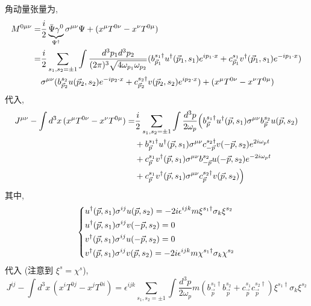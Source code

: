 \begin{itemize}
	\begin{tcolorbox}[title=calculation:]
		角动量张量为,
		\begin{align}
			M^{0 \mu \nu} =& \frac{i}{2} \underbrace{\bar{\Psi} \gamma^0}_{\Psi^\dag} \sigma^{\mu \nu} \Psi + (x^\mu T^{0 \nu} - x^\nu T^{0 \mu}) \notag \\
			=& \frac{i}{2} \sum_{s_1, s_2 = \pm 1} \int \frac{d^3 p_1 d^3 p_2}{(2 \pi)^3 \sqrt{4 \omega_{p_1} \omega_{p_2}}} (b^{s_1 \dag}_{\vec{p}_1} u^\dag(\vec{p}_1, s_1) e^{i p_1 \cdot x} + c^{s_1}_{\vec{p}_1} v^\dag(\vec{p}_1, s_1) e^{- i p_1 \cdot x}) \notag \\
			& \sigma^{\mu \nu} (b^{s_2}_{\vec{p}_2} u(\vec{p}_2, s_2) e^{- i p_2 \cdot x} + c^{s_2 \dag}_{\vec{p}_2} v(\vec{p}_2, s_2) e^{i p_2 \cdot x}) + (x^\mu T^{0 \nu} - x^\nu T^{0 \mu})
		\end{align}
		代入,
		\begin{align}
			J^{\mu \nu} - \int d^3 x \, (x^\mu T^{0 \nu} - x^\nu T^{0 \mu}) =& \frac{i}{2} \sum_{s_1, s_2 = \pm 1} \int \frac{d^3 p}{2 \omega_p} \Big( b^{s_1 \dag}_{\vec{p}} u^\dag(\vec{p}, s_1) \sigma^{\mu \nu} b^{s_2}_{\vec{p}} u(\vec{p}, s_2) \notag \\
			& + b^{s_1 \dag}_{\vec{p}} u^\dag(\vec{p}, s_1) \sigma^{\mu \nu} c^{s_2 \dag}_{- \vec{p}} v(- \vec{p}, s_2) e^{2 i \omega_p t} \notag \\
			& + c^{s_1}_{\vec{p}} v^\dag(\vec{p}, s_1) \sigma^{\mu \nu} b^{s_2}_{- \vec{p}} u(- \vec{p}, s_2) e^{- 2 i \omega_p t} \notag \\
			& + c^{s_1}_{\vec{p}} v^\dag(\vec{p}, s_1) \sigma^{\mu \nu} c^{s_2 \dag}_{\vec{p}} v(\vec{p}, s_2) \Big)
		\end{align}
		其中,
		\begin{equation}
			\begin{dcases}
				u^\dag(\vec{p}, s_1) \sigma^{i j} u(\vec{p}, s_2) = - 2 i \epsilon^{i j k} m \xi^{s_1 \dag} \sigma_k \xi^{s_2} \\
				u^\dag(\vec{p}, s_1) \sigma^{i j} v(- \vec{p}, s_2) = 0 \\
				v^\dag(\vec{p}, s_1) \sigma^{i j} u(- \vec{p}, s_2) = 0 \\
				v^\dag(\vec{p}, s_1) \sigma^{i j} v(\vec{p}, s_2) = - 2 i \epsilon^{i j k} m \chi^{s_1 \dag} \sigma_k \chi^{s_2}
			\end{dcases}
		\end{equation}
		代入 (注意到 $\xi^s = \chi^s$),
		\begin{equation}
			J^{i j} - \int d^3 x \, (x^i T^{0 j} - x^j T^{0 i}) = \epsilon^{i j k} \sum_{s_1, s_2 = \pm 1} \int \frac{d^3 p}{2 \omega_p} m (b^{s_1 \dag}_{\vec{p}} b^{s_2}_{\vec{p}} + c^{s_1}_{\vec{p}} c^{s_2 \dag}_{\vec{p}}) \xi^{s_1 \dag} \sigma_k \xi^{s_2}
		\end{equation}
	\end{tcolorbox}
\end{itemize}

